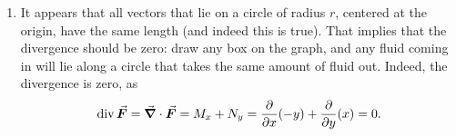\begin{example}
\begin{enumerate}
	\item It appears that all vectors that lie on a circle of radius $r$, centered at the  origin, have the same length (and indeed this is true). That implies that the divergence should be zero: draw any box on the graph, and any fluid coming in will lie along a circle that takes the same amount of fluid out. Indeed, the divergence is zero, as
	$$\divv\vec F = \vec{\nabla} \cdot \vec F = M_x + N_y = \frac{\partial}{\partial x}(-y) + \frac{\partial}{\partial y}(x) = 0.$$
	
\begin{figure}[H]
\centering
\qquad
{}\\

\end{figure}
\end{enumerate}
\end{example}
